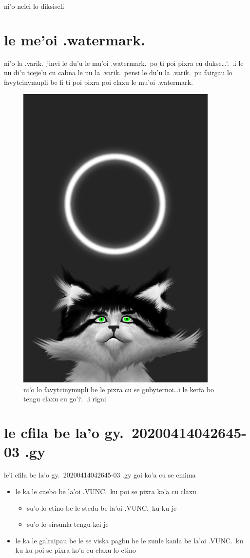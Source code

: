 \documentclass{report}
\newcommand\sds{\spacefactor\sfcode`.\ \space}
\begin{document}
ni'o nelci lo diksiseli

\section{le me'oi .watermark.}
ni'o la .varik.\ jinvi le du'u le mu'oi .watermark.\ po ti poi pixra cu dukse\ldots\sds .i le nu di'u tceje'u cu cabna le nu la .varik.\ pensi le du'u la .varik.\ pu fairgau lo favytcinymupli be fi ti poi pixra poi claxu le mu'oi .watermark.

\begin{figure}[ht]
	\centering
	\includegraphics[width=10cm]{20200414042645-03/20200414042645-03-uw.png}
	\caption[center]{ni'o lo favytcinymupli be le pixra cu se gubyternoi\ldots i le kerfa bo tengu claxu cu go'i\sds  .i rigni}
\end{figure}

\section{le cfila be la'o gy.\ 20200414042645-03 .gy}
le'i cfila be la'o gy.\ 20200414042645-03 .gy goi ko'a cu se cmima
\begin{itemize}
	\item le ka le cnebo be la'oi .VUNC.\ ku poi se pixra ko'a cu claxu
	\begin{itemize}
		\item su'o lo ctino be le stedu be la'oi .VUNC.\ ku ku je
		\item su'o lo sirsunla tengu kei je
	\end{itemize}
	\item le ka le galraipau be le se viska pagbu be le zunle kanla be la'oi .VUNC.\ ku ku ku poi se pixra ko'a cu claxu lo ctino
\end{itemize}
\end{document}
